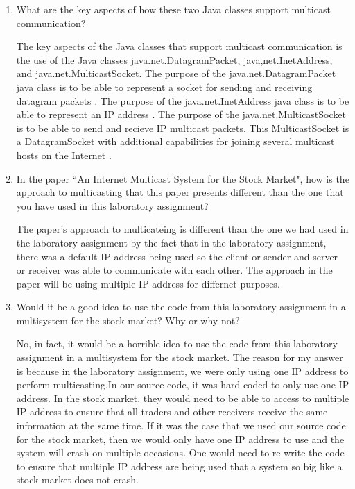 \documentclass{article}
\begin{document}
\begin{enumerate}
\item What are the key aspects of how these two Java classes support multicast communication?

The key aspects of the Java classes that support multicast communication is the use of the Java classes java.net.DatagramPacket, java,net.InetAddress, and java.net.MulticastSocket. The purpose of the java.net.DatagramPacket java class is to be able to represent a socket for sending and receiving datagram packets \cite{atagramsocket_java_platform_se_7}. The purpose of the java.net.InetAddress java class is to be able to represent an IP address \cite{inetaddress_java_platform_se_6}. The purpose of the java.net.MulticastSocket is to be able to send and recieve IP multicast packets. This MulticastSocket is a DatagramSocket with additional capabilities for joining several multicast hosts on the Internet \cite{multicastsocket_java_platform_se_7_b12}.

\item In the paper ``An Internet Multicast System for the Stock Market", how is the approach to multicasting that this paper presents different than the one that you have used in this laboratory assignment?

The paper's approach to multicateing is different than the one we had used in the laboratory assignment by the fact that in the laboratory assignment, there was a default IP address being used so the client or sender and server or receiver was able to communicate with each other. The approach in the paper will be using multiple IP address for differnet purposes.

\item Would it be a good idea to use the code from this laboratory assignment in a multisystem for the stock market? Why or why not?

No, in fact, it would be a horrible idea to use the code from this laboratory assignment in a multisystem for the stock market. The reason for my answer is because in the laboratory assignment, we were only using one IP address to perform multicasting.In our source code, it was hard coded to only use one IP address. In the stock market, they would need to be able to access to multiple IP address to ensure that all traders and other receivers receive the same information at the same time. If it was the case that we used our source code for the stock market, then we would only have one IP address to use and the system will crash on multiple occasions. One would need to re-write the code to ensure that multiple IP address are being used that a system so big like a stock market does not crash.
\end{enumerate}
\end{document}
